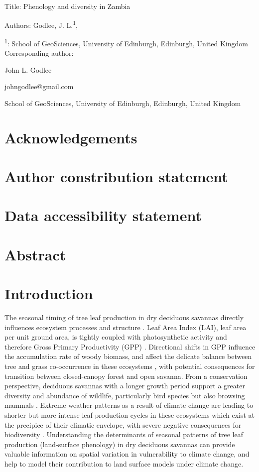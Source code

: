 \documentclass[11pt,a4paper]{article}
\newcommand{\titletext}{Phenology and diversity in Zambia}
\begin{document}
{\Large{Title: \titletext{}}}

Authors: Godlee, J. L.\textsuperscript{1}, 

\textsuperscript{1}: School of GeoSciences, University of Edinburgh, Edinburgh, United Kingdom \\

\vspace{1em}
Corresponding author:

John L. Godlee

johngodlee@gmail.com

School of GeoSciences, University of Edinburgh, Edinburgh, United Kingdom

\section*{Acknowledgements}

\section*{Author constribution statement}

\section*{Data accessibility statement}

\newpage{}
\linenumbers



\section*{Abstract}

\section{Introduction}

The seasonal timing of tree leaf production in dry deciduous savannas directly influences ecosystem processes and structure \citep{}. Leaf Area Index (LAI), leaf area per unit ground area, is tightly coupled with photosynthetic activity and therefore Gross Primary Productivity (GPP) \citep{}. Directional shifts in GPP influence the accumulation rate of woody biomass, and affect the delicate balance between tree and grass co-occurrence in these ecosystems \citep{}, with potential consequences for transition between closed-canopy forest and open savanna. From a conservation perspective, deciduous savannas with a longer growth period support a greater diversity and abundance of wildlife, particularly bird species but also browsing mammals \citep{}. Extreme weather patterns as a result of climate change are leading to shorter but more intense leaf production cycles in these ecosystems which exist at the precipice of their climatic envelope, with severe negative consequences for biodiversity \citep{}. Understanding the determinants of seasonal patterns of tree leaf production (land-surface phenology) in dry deciduous savannas can provide valuable information on spatial variation in vulnerability to climate change, and help to model their contribution to land surface models under climate change.
\end{document}
